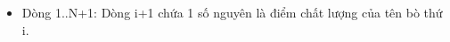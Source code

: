 \begin{itemize}
	\item     Dòng 1..N+1: Dòng i+1 chứa 1 số nguyên là điểm chất lượng của tên bò thứ i.   
\end{itemize}

\